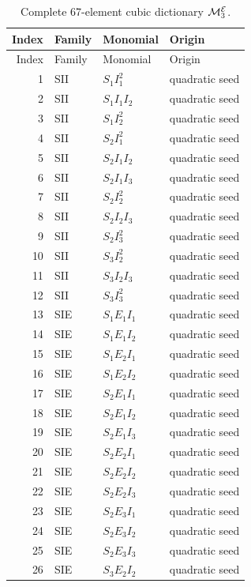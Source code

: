 \begin{longtable}{@{}rlll@{}}
\caption{Complete 67-element cubic dictionary $\mathcal M_3^{\mathcal{E}}$.}
\label{tab:complete_m3_dictionary}\\
\toprule
Index & Family & Monomial & Origin\\
\midrule
\endfirsthead
\toprule
Index & Family & Monomial & Origin\\
\midrule
\endhead
1 & SII & $S_1I_1^{2}$ & quadratic seed \\
2 & SII & $S_1I_1I_2$ & quadratic seed \\
3 & SII & $S_1I_2^{2}$ & quadratic seed \\
4 & SII & $S_2I_1^{2}$ & quadratic seed \\
5 & SII & $S_2I_1I_2$ & quadratic seed \\
6 & SII & $S_2I_1I_3$ & quadratic seed \\
7 & SII & $S_2I_2^{2}$ & quadratic seed \\
8 & SII & $S_2I_2I_3$ & quadratic seed \\
9 & SII & $S_2I_3^{2}$ & quadratic seed \\
10 & SII & $S_3I_2^{2}$ & quadratic seed \\
11 & SII & $S_3I_2I_3$ & quadratic seed \\
12 & SII & $S_3I_3^{2}$ & quadratic seed \\
13 & SIE & $S_1E_1I_1$ & quadratic seed \\
14 & SIE & $S_1E_1I_2$ & quadratic seed \\
15 & SIE & $S_1E_2I_1$ & quadratic seed \\
16 & SIE & $S_1E_2I_2$ & quadratic seed \\
17 & SIE & $S_2E_1I_1$ & quadratic seed \\
18 & SIE & $S_2E_1I_2$ & quadratic seed \\
19 & SIE & $S_2E_1I_3$ & quadratic seed \\
20 & SIE & $S_2E_2I_1$ & quadratic seed \\
21 & SIE & $S_2E_2I_2$ & quadratic seed \\
22 & SIE & $S_2E_2I_3$ & quadratic seed \\
23 & SIE & $S_2E_3I_1$ & quadratic seed \\
24 & SIE & $S_2E_3I_2$ & quadratic seed \\
25 & SIE & $S_2E_3I_3$ & quadratic seed \\
26 & SIE & $S_3E_2I_2$ & quadratic seed \\

\end{longtable}
